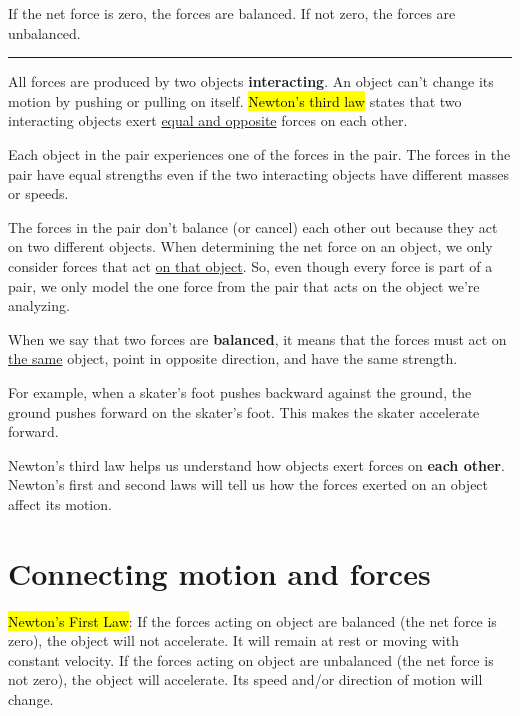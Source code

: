 If the net force is zero, the forces are balanced. If not zero, the forces are unbalanced.

\noindent\rule{\textwidth}{0.4pt}

All forces are produced by two objects \textbf{interacting}. An object can’t change its motion by pushing or pulling on itself. \hl{Newton's third law} states that two interacting objects exert \underline{equal and opposite} forces on each other.

Each object in the pair experiences one of the forces in the pair. The forces in the pair have equal strengths even if the two interacting objects have different masses or speeds.

The forces in the pair don't balance (or cancel) each other out because they act on two different objects. When determining the net force on an object, we only consider forces that act \underline{on that object}. So, even though every force is part of a pair, we only model the one force from the pair that acts on the object we're analyzing.

When we say that two forces are \textbf{balanced}, it means that the forces must act on \underline{the same} object, point in opposite direction, and have the same strength.

For example, when a skater’s foot pushes backward against the ground, the ground pushes forward on the skater’s foot. This makes the skater accelerate forward.

\vspace{.5cm}

Newton's third law helps us understand how objects exert forces on \textbf{each other}. Newton's first and second laws will tell us how the forces exerted on an object affect its motion. 

\section{Connecting motion and forces}

\hl{Newton's First Law}: If the forces acting on object are balanced (the net force is zero), the object will not accelerate. It will remain at rest or moving with constant velocity. If the forces acting on object are unbalanced (the net force is not zero), the object will accelerate. Its speed and/or direction of motion will change. 
